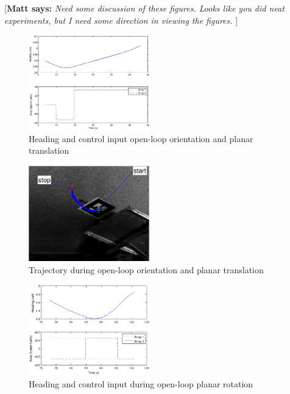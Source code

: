 \documentclass[letterpaper, 10 pt, conference]{ieeeconf}  %
\newcommand{\matt}[1]{{\color{darkgreen}\small\par {[{\bf Matt says:} {\em #1}} ] \\    }}
\begin{document}
\matt{Need some discussion of these figures. Looks like you did neat experiments, but I need some direction in viewing the figures.}

  \begin{figure}[thpb]
      \centering
      \includegraphics[width = 0.47\textwidth]{figures/driving_forward_control.eps}
      \caption{Heading and control input open-loop orientation and planar translation}
      \label{fig:planartranslationcontrol}
   \end{figure}
   
   \begin{figure}[thpb]
      \centering
      \includegraphics[width = 0.47\textwidth]{figures/driving_forward_trajectory.eps}
      \caption{Trajectory during open-loop orientation and planar translation}
      \label{fig:planartranslationtrajectory}
   \end{figure}
   
      \begin{figure}[thpb]
      \centering
      \includegraphics[width = 0.47\textwidth]{figures/planar_rotation.eps}
      \caption{Heading and control input during open-loop planar rotation}
      \label{fig:planartranslationtrajectory}
   \end{figure}
   
\end{document}

